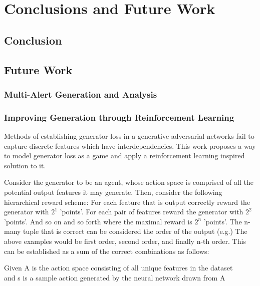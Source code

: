 %
%
%

\chapter{Conclusions and Future Work}

\section{Conclusion}

\section{Future Work}

\subsection{Multi-Alert Generation and Analysis}

\subsection{Improving Generation through Reinforcement Learning}

Methods of establishing generator loss in a generative adversarial networks fail to capture discrete features which have interdependencies. This work proposes a way to model generator loss as a game and apply a reinforcement learning inspired solution to it. 

Consider the generator to be an agent, whose action space is comprised of all the potential output features it may generate. Then, consider the following  hierarchical reward scheme: For each feature that is output correctly reward the generator with $2^1$ 'points'. For each pair of features reward the generator with $2^2$ 'points'. And so on and so forth where the maximal reward is $2^n$ 'points'. The n-many tuple that is correct can be considered the order of the output (e.g.) The above examples would be first order, second order, and finally n-th order. This can be established as a sum of the correct combinations as follows:

{
	\centering
	Given A is the action space consisting of all unique features in the dataset\\
	and s is a sample action generated by the neural network drawn from A\\
}

